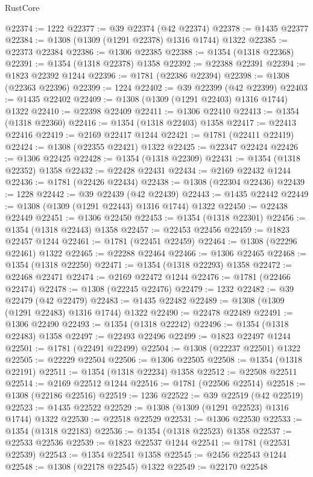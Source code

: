 \begin{lexlean}{RustCore}
\begin{coremodule}
@22374 := 1222
@22377 := @39 @22374 (@42 @22374)
@22378 := @1435 @22377
@22384 := @1308 (@1309 (@1291 @22378) @1316 @1744) @1322
@22385 := @22373 @22384
@22386 := @1306 @22385
@22388 := @1354 (@1318 @22368)
@22391 := @1354 (@1318 @22378) @1358
@22392 := @22388 @22391
@22394 := @1823 @22392 @1244
@22396 := @1781 (@22386 @22394)
@22398 := @1308 (@22363 @22396)
@22399 := 1224
@22402 := @39 @22399 (@42 @22399)
@22403 := @1435 @22402
@22409 := @1308 (@1309 (@1291 @22403) @1316 @1744) @1322
@22410 := @22398 @22409
@22411 := @1306 @22410
@22413 := @1354 (@1318 @22360)
@22416 := @1354 (@1318 @22403) @1358
@22417 := @22413 @22416
@22419 := @2169 @22417 @1244
@22421 := @1781 (@22411 @22419)
@22424 := @1308 (@22355 @22421) @1322
@22425 := @22347 @22424
@22426 := @1306 @22425
@22428 := @1354 (@1318 @22309)
@22431 := @1354 (@1318 @22352) @1358
@22432 := @22428 @22431
@22434 := @2169 @22432 @1244
@22436 := @1781 (@22426 @22434)
@22438 := @1308 (@22304 @22436)
@22439 := 1228
@22442 := @39 @22439 (@42 @22439)
@22443 := @1435 @22442
@22449 := @1308 (@1309 (@1291 @22443) @1316 @1744) @1322
@22450 := @22438 @22449
@22451 := @1306 @22450
@22453 := @1354 (@1318 @22301)
@22456 := @1354 (@1318 @22443) @1358
@22457 := @22453 @22456
@22459 := @1823 @22457 @1244
@22461 := @1781 (@22451 @22459)
@22464 := @1308 (@22296 @22461) @1322
@22465 := @22288 @22464
@22466 := @1306 @22465
@22468 := @1354 (@1318 @22250)
@22471 := @1354 (@1318 @22293) @1358
@22472 := @22468 @22471
@22474 := @2169 @22472 @1244
@22476 := @1781 (@22466 @22474)
@22478 := @1308 (@22245 @22476)
@22479 := 1232
@22482 := @39 @22479 (@42 @22479)
@22483 := @1435 @22482
@22489 := @1308 (@1309 (@1291 @22483) @1316 @1744) @1322
@22490 := @22478 @22489
@22491 := @1306 @22490
@22493 := @1354 (@1318 @22242)
@22496 := @1354 (@1318 @22483) @1358
@22497 := @22493 @22496
@22499 := @1823 @22497 @1244
@22501 := @1781 (@22491 @22499)
@22504 := @1308 (@22237 @22501) @1322
@22505 := @22229 @22504
@22506 := @1306 @22505
@22508 := @1354 (@1318 @22191)
@22511 := @1354 (@1318 @22234) @1358
@22512 := @22508 @22511
@22514 := @2169 @22512 @1244
@22516 := @1781 (@22506 @22514)
@22518 := @1308 (@22186 @22516)
@22519 := 1236
@22522 := @39 @22519 (@42 @22519)
@22523 := @1435 @22522
@22529 := @1308 (@1309 (@1291 @22523) @1316 @1744) @1322
@22530 := @22518 @22529
@22531 := @1306 @22530
@22533 := @1354 (@1318 @22183)
@22536 := @1354 (@1318 @22523) @1358
@22537 := @22533 @22536
@22539 := @1823 @22537 @1244
@22541 := @1781 (@22531 @22539)
@22543 := @1354 @22541 @1358
@22545 := @2456 @22543 @1244
@22548 := @1308 (@22178 @22545) @1322
@22549 := @22170 @22548

\end{coremodule}
\end{lexlean}
